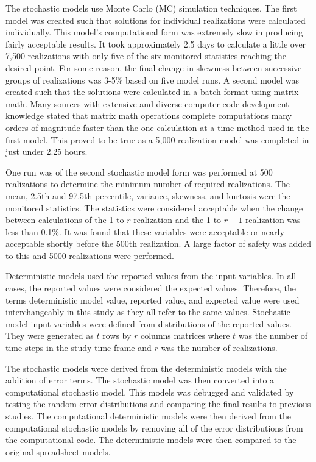 \begin{linenumbers}
The stochastic models use Monte Carlo (MC) simulation techniques.  The first model was created such that solutions for individual realizations were calculated individually.  This model's computational form was extremely slow in producing fairly acceptable results.  It took approximately 2.5 days to calculate a little over 7,500 realizations with only five of the six monitored statistics reaching the desired point.  For some reason, the final change in skewness between successive groups of realizations was 3-5\% based on five model runs.  A second model was created such that the solutions were calculated in a batch format using matrix math.  Many sources with extensive and diverse computer code development knowledge stated that matrix math operations complete computations many orders of magnitude faster than the one calculation at a time method used in the first model.  This proved to be true as a 5,000 realization model was completed in just under 2.25 hours.

One run was of the second stochastic model form was performed at 500 realizations to determine the minimum number of required realizations.  The mean, 2.5th and 97.5th percentile, variance, skewness, and kurtosis were the monitored statistics.  The statistics were considered acceptable when the change between calculations of the 1 to $r$ realization and the 1 to $r-1$ realization was less than 0.1\%.  It was found that these variables were acceptable or nearly acceptable shortly before the 500th realization.  A large factor of safety was added to this and 5000 realizations were performed.

Deterministic models used the reported values from the input variables.  In all cases, the reported values were considered the expected values.  Therefore, the terms deterministic model value, reported value, and expected value were used interchangeably in this study as they all refer to the same values.  Stochastic model input variables were defined from distributions of the reported values.  They were generated as $t$ rows by $r$ columns matrices where $t$ was the number of time steps in the study time frame and $r$ was the number of realizations.

The stochastic models were derived from the deterministic models with the addition of error terms.  The stochastic model was then converted into a computational stochastic model.  This models was debugged and validated by testing the random error distributions and comparing the final results to previous studies.  The computational deterministic models were then derived from the computational stochastic models by removing all of the error distributions from the computational code.  The deterministic models were then compared to the original spreadsheet models.


\end{linenumbers}
